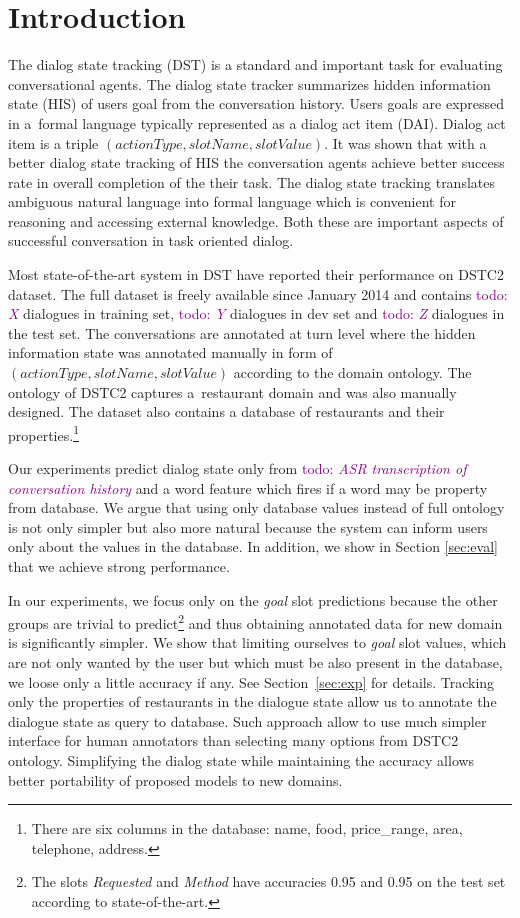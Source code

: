 \documentclass{itatnew}
\def\todo#1{\textcolor{purple}{todo: \textit{#1}}}
\begin{document}
\section{Introduction}
%
The dialog state tracking (DST) is a standard and important task for evaluating conversational agents\cite{williams2013dialog, henderson2014second, henderson2014third}.
The dialog state tracker summarizes hidden information state (HIS)\cite{young2010hidden} of users goal from the conversation history.
Users goals are expressed in a~formal language typically represented as a dialog act item (DAI). Dialog act item is a triple $(actionType, slotName, slotValue)$.
It was shown that with a better dialog state tracking of HIS the conversation agents achieve better success rate in overall completion of the their task\cite{jurvcivcek2012reinforcement}.
The dialog state tracking translates ambiguous natural language into formal language which is convenient for reasoning and accessing external knowledge. Both these are important aspects of successful conversation in task oriented dialog.

Most state-of-the-art system in DST have reported their performance on DSTC2 dataset\cite{henderson2014second}. 
The full dataset is freely available since January 2014 and contains \todo{X} dialogues in training set, \todo{Y} dialogues in dev set and \todo{Z} dialogues in the test set.
The conversations are annotated at turn level where the hidden information state was annotated manually in form of $(actionType, slotName, slotValue)$
according to the
domain ontology.
The ontology of DSTC2 captures a~restaurant domain and was also manually designed.
The dataset also contains a database of restaurants and their properties.\footnote{There are six columns in the database: name, food, price\_range, area, telephone, address.}

Our experiments predict dialog state only from \todo{ASR transcription of conversation history } and a word feature which fires if a word may be property from database.
We argue that using only database values instead of full ontology is not only simpler but also more natural because the system can inform users only about the values in the database.
In addition, we show in Section \ref{sec:eval} that we achieve strong performance.

In our experiments, we focus only on the {\it goal} slot predictions because the other groups are trivial to predict\footnote{The slots {\it Requested} and {\it Method} have accuracies 0.95 and 0.95 on the test set according to state-of-the-art\cite{williams2014web}.} and thus obtaining annotated data for new domain is significantly simpler.
We show that limiting ourselves to {\it goal} slot values, which are not only wanted by the user but which must be also present in the database, we loose only a little accuracy if any.
See Section~\ref{sec:exp} for details.
Tracking only the properties of restaurants in the dialogue state allow us to annotate the dialogue state as query to database. Such approach allow to use much simpler interface for human annotators than selecting many options from DSTC2 ontology.
Simplifying the dialog state while maintaining the accuracy allows better portability of proposed models to new domains.
\end{document}
